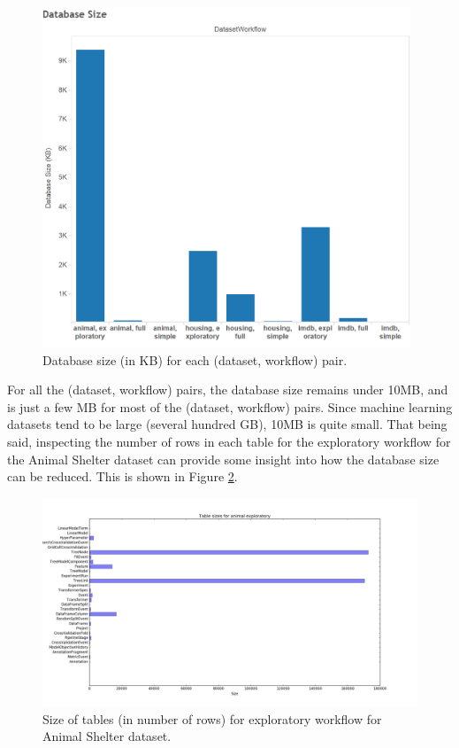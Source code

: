 \begin{figure}
  \centering
  \includegraphics[height=4.0in]{dbsize}
  \caption{
    Database size (in KB) for each (dataset, workflow) pair.
  }
  \label{fig:dbsize}
\end{figure}

For all the (dataset, workflow) pairs, the database size remains under 10MB, and is
just a few MB for most of the (dataset, workflow) pairs. Since machine learning datasets
tend to be large (several hundred GB), 10MB is quite small. That being said, inspecting
the number of rows in each table for the exploratory workflow for the Animal Shelter dataset 
can provide some insight into how the database size can be reduced. This is shown in Figure
\ref{fig:animal_exploratory_table_sizes}.

\begin{figure}
  \centering
  \includegraphics[width=6.0in]{animal_exploratory_table_sizes}
  \caption{
    Size of tables (in number of rows) for exploratory workflow for Animal
    Shelter dataset.
  }
  \label{fig:animal_exploratory_table_sizes}
\end{figure}

